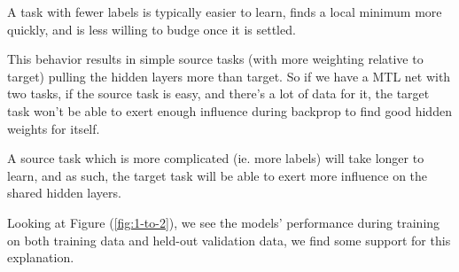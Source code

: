 \documentclass[a4paper]{article}
\begin{document}
A task with fewer labels is typically easier to learn, finds a local minimum more quickly, and is less willing to budge once it is settled.

This behavior results in simple source tasks (with more weighting relative to target) pulling the hidden layers more than target. So if we have a MTL net with two tasks, if the source task is easy, and there's a lot of data for it, the target task won't be able to exert enough influence during backprop to find good hidden weights for itself.

A source task which is more complicated (ie. more labels) will take longer to learn, and as such, the target task will be able to exert more influence on the shared hidden layers.


Looking at Figure (\ref{fig:1-to-2}), we see the models' performance during training on both training data and held-out validation data, we find some support for this explanation.
\end{document}
